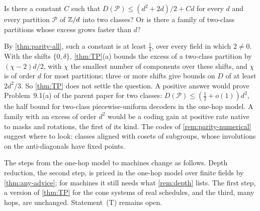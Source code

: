 \begin{problem}\label{prob:twoclass}
Is there a constant $C$ such that $D(\mathcal P)\le(d^2+2d)/2+Cd$ for every $d$ and every partition $\mathcal P$ of $\mathbb{Z}/d$
into two classes? Or is there a family of two-class partitions whose excess grows faster than $d$?
\end{problem}

By \cref{thm:parity-all}, such a constant is at least $\frac14$, over every field in which $2\ne0$. With the shifts
$\{0,\delta\}$, \cref{thm:TP}(a) bounds the excess of a two-class partition by $(\chi-2)d/2$, with $\chi$ the smallest
number of components over these shifts, and $\chi$ is of order $d$ for most partitions; three or more shifts give
bounds on $D$ of at least $2d^2/3$. So \cref{thm:TP} does not settle the question. A positive answer would prove Problem~9.1(a) of the parent
paper for two classes: $D(\mathcal P)\le(\frac12+o(1))d^2$, the half bound for two-class piecewise-uniform decoders in
the one-hop model. A family with an excess of order $d^2$ would be a coding gain at positive rate native to masks and
rotations, the first of its kind. The codes of \cref{rem:parity-numerical} suggest where to look: classes aligned with
cosets of subgroups, whose involutions on the anti-diagonals have fixed points.

The steps from the one-hop model to machines \cite[Section~7.4]{SeventeenthPaper2026} change as follows. Depth
reduction, the second step, is priced in the one-hop model over finite fields by \cref{thm:any-advice}; for machines it
still needs what \cref{rem:depth} lists. The first step, a version of \cref{thm:TP} for the cone systems of real
schedules, and the third, many hops, are unchanged. Statement~(T) remains open.

